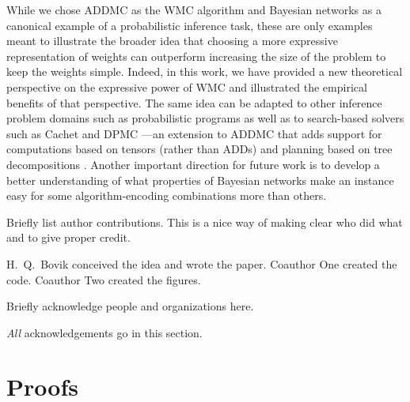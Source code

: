 \documentclass{uai2021} %
\theoremstyle{definition}
\begin{document}
While we chose \textsf{ADDMC} as the WMC algorithm and Bayesian networks as a
canonical example of a probabilistic inference task, these are only examples
meant to illustrate the broader idea that choosing a more expressive
representation of weights can outperform increasing the size of the problem to
keep the weights simple. Indeed, in this work, we have provided a new
theoretical perspective on the expressive power of WMC and illustrated the
empirical benefits of that perspective. The same idea can be adapted to other
inference problem domains such as probabilistic programs
\citep{DBLP:journals/tplp/FierensBRSGTJR15,DBLP:journals/corr/abs-2005-09089} as
well as to search-based solvers such as \textsf{Cachet}
\citep{DBLP:conf/sat/SangBBKP04} and \textsf{DPMC}
---an extension to \textsf{ADDMC} that adds support for computations based on
tensors (rather than ADDs) and planning based on tree decompositions
\cite{DBLP:conf/cp/DudekPV20}. Another important direction for future work is to
develop a better understanding of what properties of Bayesian networks make an
instance easy for some algorithm-encoding combinations more than others.

\begin{contributions} %
    Briefly list author contributions.
    This is a nice way of making clear who did what and to give proper credit.

    H.~Q.~Bovik conceived the idea and wrote the paper.
    Coauthor One created the code.
    Coauthor Two created the figures.
\end{contributions}

\begin{acknowledgements} %
    Briefly acknowledge people and organizations here.

    \emph{All} acknowledgements go in this section.
\end{acknowledgements}

\clearpage


\clearpage
\appendix
\section{Proofs}
\end{document}
